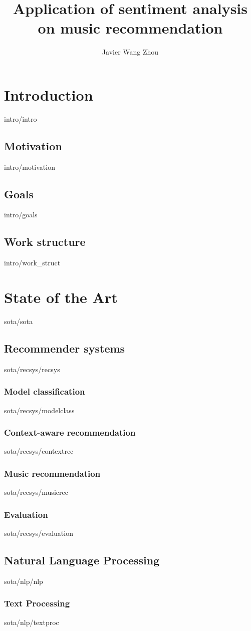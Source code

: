 \documentclass[english,epsbased,copyright,final,printable,covers,extendedindex,firstnumbered,tfg,gnuplot,loc,loe,lof,lot]{tfgtfmthesisuam}
\title{Application of sentiment analysis on music recommendation}
\subtitle{}
\author{Javier Wang Zhou}
\begin{document}
  \chapter{Introduction\label{CAP:INTRODUCTION}}{intro/intro}
    \section{Motivation\label{SEC:MOTIVATION}}{intro/motivation}
    \section{Goals\label{SEC:GOALS}}{intro/goals}
    \section{Work structure\label{SEC:WORK_STRUCT}}{intro/work_struct}
  \chapter{State of the Art\label{CAP:STATE_OF_THE_ART}}{sota/sota}
    \section{Recommender systems\label{SEC:RECSYS}}{sota/recsys/recsys}
      \subsection{Model classification\label{SS:MODELCLASS}}{sota/recsys/modelclass}
      \subsection{Context-aware recommendation\label{SS:CONTEXTREC}}{sota/recsys/contextrec}
      \subsection{Music recommendation\label{SS:MUSICREC}}{sota/recsys/musicrec}
      \subsection{Evaluation\label{SS:EVALUATION}}{sota/recsys/evaluation}
    \section{Natural Language Processing\label{SEC:NLP}}{sota/nlp/nlp}
      \subsection{Text Processing\label{SS:TEXTPROC}}{sota/nlp/textproc}
\end{document}
